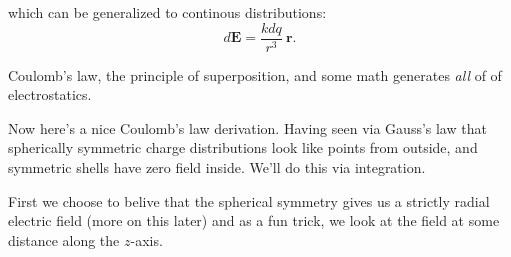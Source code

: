 \documentclass{article}
\begin{document}
which can be generalized to continous distributions:
\begin{equation*}
    d\bm{E} = \frac{k dq}{r^3}\ \bm{r}.
\end{equation*}

Coulomb's law, the principle of superposition, and some math generates \emph{all} of of electrostatics.

Now here's a nice Coulomb's law derivation. Having seen via Gauss's law that spherically symmetric charge distributions look like points from outside, and symmetric shells have zero field inside. We'll do this via integration.

\vspace{1em}

First we choose to belive that the spherical symmetry gives us a strictly radial electric field (more on this later) and as a fun trick, we look at the field at some distance along the $z$-axis.

\vspace{1em}
\end{document}
